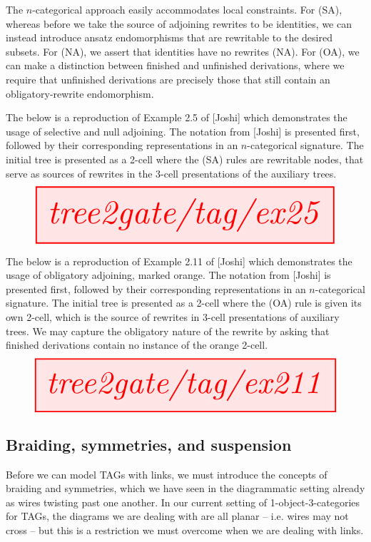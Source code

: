 The $n$-categorical approach easily accommodates local constraints. For (SA), whereas before we take the source of adjoining rewrites to be identities, we can instead introduce ansatz endomorphisms that are rewritable to the desired subsets. For (NA), we assert that identities have no rewrites (NA). For (OA), we can make a distinction between finished and unfinished derivations, where we require that unfinished derivations are precisely those that still contain an obligatory-rewrite endomorphism.

\begin{example}
The below is a reproduction of Example 2.5 of [Joshi] which demonstrates the usage of selective and null adjoining. The notation from [Joshi] is presented first, followed by their corresponding representations in an $n$-categorical signature. The initial tree is presented as a 2-cell where the (SA) rules are rewritable nodes, that serve as sources of rewrites in the 3-cell presentations of the auxiliary trees.
\[\resizebox{\textwidth}{!}{\tikzfig{tree2gate/tag/ex25}}\]
\end{example}

\begin{example}
The below is a reproduction of Example 2.11 of [Joshi] which demonstrates the usage of obligatory adjoining, marked orange. The notation from [Joshi] is presented first, followed by their corresponding representations in an $n$-categorical signature. The initial tree is presented as a 2-cell where the (OA) rule is given its own 2-cell, which is the source of rewrites in 3-cell presentations of auxiliary trees. We may capture the obligatory nature of the rewrite by asking that finished derivations contain no instance of the orange 2-cell.
\[\resizebox{\textwidth}{!}{\tikzfig{tree2gate/tag/ex211}}\]
\end{example}

\subsection{Braiding, symmetries, and suspension}

Before we can model TAGs with links, we must introduce the concepts of braiding and symmetries, which we have seen in the diagrammatic setting already as wires twisting past one another. In our current setting of 1-object-3-categories for TAGs, the diagrams we are dealing with are all planar -- i.e. wires may not cross -- but this is a restriction we must overcome when we are dealing with links.\\

